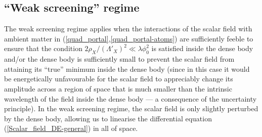 \documentclass[aps,prd,onecolumn,nofootinbib]{revtex4-2} %
\begin{document}
\subsection{``Weak screening'' regime}
\label{Sec:Appendix_weak}
The weak screening regime applies when the interactions of the scalar field with ambient matter in (\ref{quad_portal},\ref{quad_portal-atoms}) are sufficiently feeble to ensure that the condition $2 \rho_X / (\Lambda'_X)^2 \ll \lambda \phi_0^2$ is satisfied inside the dense body and/or the dense body is sufficiently small to prevent the scalar field from attaining its ``true'' minimum inside the dense body (since in this case it would be energetically unfavourable for the scalar field to appreciably change its amplitude across a region of space that is much smaller than the intrinsic wavelength of the field inside the dense body --- a consequence of the uncertainty principle). 
In the weak screening regime, the scalar field is only slightly perturbed by the dense body, allowing us to linearise the differential equation (\ref{Scalar_field_DE-general}) in all of space. 
\end{document}
